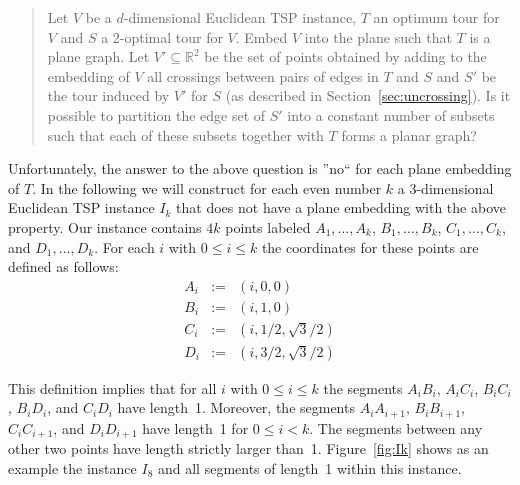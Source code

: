 \documentclass[a4paper, 11pt]{article}
\begin{document}
\begin{quote}
Let $V$ be a $d$-dimensional Euclidean TSP instance, $T$ an optimum tour for $V$ and $S$ a 2-optimal tour for $V$. Embed $V$ into the plane such that $T$ is a plane graph. 
Let $V'\subseteq \mathbb{R}^2$ be the set of points obtained by adding to the embedding of $V$ all
crossings between pairs of edges in $T$ and $S$ and $S'$ be the tour induced by $V'$ for $S$ (as described in Section~\ref{sec:uncrossing}). 
Is it possible to partition the edge set of $S'$ into a constant number of subsets such that each of these subsets together with $T$ forms a planar graph?      
\end{quote}

Unfortunately, the answer to the above question is ''no`` for each plane embedding of $T$. In the following we will construct for each even number $k$ a 3-dimensional Euclidean TSP instance $I_k$ that does not have a plane embedding with the above property. Our instance contains $4k$ points labeled $A_1, \ldots, A_k$, $B_1, \ldots, B_k$, $C_1, \ldots, C_k$, and $D_1, \ldots, D_k$. For each $i$ with $0\le i\le k$ the coordinates for these points are defined as follows: 
\begin{eqnarray*}
A_i & := & (i, 0, 0) \\
B_i & := & (i, 1, 0) \\
C_i & := & (i, 1/2, \sqrt 3 /2) \\
D_i & := & (i, 3/2, \sqrt 3 /2) 
\end{eqnarray*}

This definition implies that for all $i$ with $0\le i\le k$ the segments $A_iB_i$, $A_iC_i$, $B_iC_i$, $B_iD_i$, and
$C_iD_i$ have length~1. Moreover, the segments $A_iA_{i+1}$, $B_iB_{i+1}$, $C_iC_{i+1}$, and $D_iD_{i+1}$ have length~1 for
$0\le i < k$. The segments between any other two points have length strictly larger than~1. Figure~\ref{fig:Ik} shows as an example
the instance $I_8$ and all segments of length~1 within this instance.





\newcommand{\myGlobalTransformation}[2]
{
    \pgftransformcm{1}{0}{0.4}{0.5}{\pgfpoint{#1cm}{#2cm}}
}


\newcommand{\gridThreeD}[3]
{
    \begin{scope}
        \myGlobalTransformation{#1}{#2};
        \fill[white,fill opacity=0.6] (0,0) rectangle (9,3);
        \draw [#3,step=1.25cm] grid (9,3);
    \end{scope}
}
\end{document}
